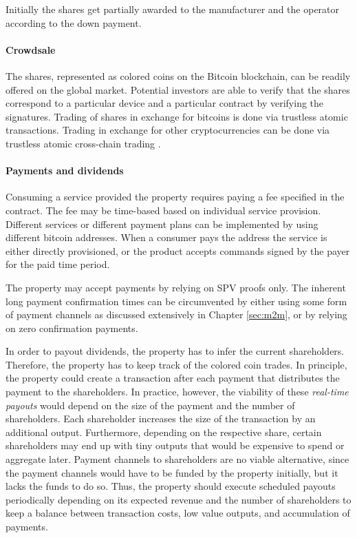 Initially the shares get partially awarded to the manufacturer and the operator according to the down payment.

\paragraph{Crowdsale}

The shares, represented as colored coins on the Bitcoin blockchain, can be readily offered on the global market. Potential investors are able to verify that the shares correspond to a particular device and a particular contract by verifying the signatures. Trading of shares in exchange for bitcoins is done via trustless atomic transactions. Trading in exchange for other cryptocurrencies can be done via trustless atomic cross-chain trading \parencite{atomiccrosschaintrading}.

\paragraph{Payments and dividends}

Consuming a service provided the property requires paying a fee specified in the contract. The fee may be time-based based on individual service provision. Different services or different payment plans can be implemented by using different bitcoin addresses. When a consumer pays the address the service is either directly provisioned, or the product accepts commands signed by the payer for the paid time period.

The property may accept payments by relying on SPV proofs only. The inherent long payment confirmation times can be circumvented by either using some form of payment channels as discussed extensively in Chapter \ref{sec:m2m}, or by relying on zero confirmation payments.

In order to payout dividends, the property has to infer the current shareholders. Therefore, the property has to keep track of the colored coin trades. In principle, the property could create a transaction after each payment that distributes the payment to the shareholders. In practice, however, the viability of these \emph{real-time payouts} would depend on the size of the payment and the number of shareholders. Each shareholder increases the size of the transaction by an additional output. Furthermore, depending on the respective share, certain shareholders may end up with tiny outputs that would be expensive to spend or aggregate later.
Payment channels to shareholders are no viable alternative, since the payment channels would have to be funded by the property initially, but it lacks the funds to do so. Thus, the property should execute scheduled payouts periodically depending on its expected revenue and the number of shareholders to keep a balance between transaction costs, low value outputs, and accumulation of payments.

